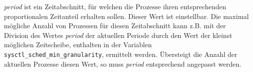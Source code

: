 \textit{period} ist ein Zeitabschnitt, für welchen die Prozesse ihren entsprechenden proportionalen Zeitanteil erhalten sollen. Dieser Wert ist einstellbar.
Die maximal mögliche Anzahl von Prozessen für diesen Zeitabschnitt kann z.B. mit der Division des Wertes \textit{period} der aktuellen Periode durch den Wert der kleinst mög\-li\-chen Zeitscheibe, enthalten in der Variablen \texttt{sys\-ctl\_sched\_min\_granulari\-ty}, ermittelt werden.  
Über\-steigt die Anzahl der aktuellen Prozesse diesen Wert, so muss \textit{period} entsprechend angepasst werden.







